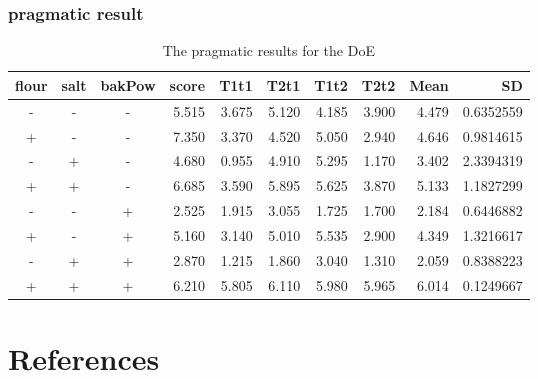\documentclass[
  a4paper,
]{scrbook}
\begin{document}
\subsection{pragmatic result}\label{pragmatic-result}

\begingroup
\fontsize{12.0pt}{14.4pt}\selectfont

\begin{longtable}{cccrrrrrrr}

\caption{\label{tbl-pragm-res}The pragmatic results for the DoE}

\tabularnewline

\toprule
flour & salt & bakPow & score & T1t1 & T2t1 & T1t2 & T2t2 & Mean & SD \\ 
\midrule\addlinespace[2.5pt]
- & - & - & 5.515 & 3.675 & 5.120 & 4.185 & 3.900 & 4.479 & 0.6352559 \\ 
+ & - & - & 7.350 & 3.370 & 4.520 & 5.050 & 2.940 & 4.646 & 0.9814615 \\ 
- & + & - & 4.680 & 0.955 & 4.910 & 5.295 & 1.170 & 3.402 & 2.3394319 \\ 
+ & + & - & 6.685 & 3.590 & 5.895 & 5.625 & 3.870 & 5.133 & 1.1827299 \\ 
- & - & + & 2.525 & 1.915 & 3.055 & 1.725 & 1.700 & 2.184 & 0.6446882 \\ 
+ & - & + & 5.160 & 3.140 & 5.010 & 5.535 & 2.900 & 4.349 & 1.3216617 \\ 
- & + & + & 2.870 & 1.215 & 1.860 & 3.040 & 1.310 & 2.059 & 0.8388223 \\ 
+ & + & + & 6.210 & 5.805 & 6.110 & 5.980 & 5.965 & 6.014 & 0.1249667 \\ 
\bottomrule

\end{longtable}

\endgroup


\chapter{References}\label{references}
\end{document}
